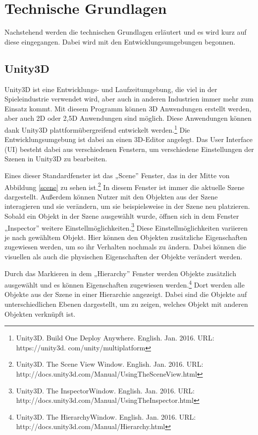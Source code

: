 \chapter{Technische Grundlagen}
	Nachstehend werden die technischen Grundlagen erläutert und es wird kurz auf diese eingegangen. Dabei wird mit den Entwicklungsumgebungen begonnen.

\section{Unity3D}

Unity3D ist eine Entwicklungs- und Laufzeitumgebung, die viel in der Spieleindustrie verwendet wird, aber auch in anderen Industrien immer mehr zum Einsatz kommt. Mit diesem Programm können 3D Anwendungen erstellt werden, aber auch 2D oder 2,5D Anwendungen sind möglich. Diese Anwendungen können dank Unity3D plattformübergreifend entwickelt werden.\footnote{Unity3D. Build One Deploy Anywhere. English. Jan. 2016. URL: https://unity3d.
com/unity/multiplatform} Die Entwicklungsumgebung ist dabei an einen 3D-Editor angelegt. Das User Interface (UI) besteht dabei aus verschiedenen Fenstern, um verschiedene Einstellungen der Szenen in Unity3D zu bearbeiten. 

Eines dieser Standardfenster ist das „Scene” Fenster, das in der Mitte von Abbildung \ref{scene} zu sehen ist.\footnote{Unity3D. The Scene View Window. English. Jan. 2016. URL: http://docs.unity3d.com/Manual/UsingTheSceneView.html} In diesem Fenster ist immer die aktuelle Szene dargestellt. Außerdem können Nutzer mit den Objekten aus der Szene interagieren und sie verändern, um sie beispielsweise in der Szene neu platzieren. Sobald ein Objekt in der Szene ausgewählt wurde, öffnen sich in dem Fenster „Inspector” weitere Einstellmöglichkeiten.\footnote{Unity3D. The InspectorWindow. English. Jan. 2016. URL: http://docs.unity3d.com/Manual/UsingTheInspector.html} Diese Einstellmöglichkeiten variieren je nach gewähltem Objekt. Hier können den Objekten zusätzliche Eigenschaften zugewiesen werden, um so ihr Verhalten nochmals zu ändern. Dabei können die visuellen als auch die physischen Eigenschaften der Objekte verändert werden.

Durch das Markieren in dem „Hierarchy” Fenster werden Objekte zusätzlich ausgewählt und es können Eigenschaften zugewiesen werden.\footnote{Unity3D. The HierarchyWindow. English. Jan. 2016. URL: http://docs.unity3d.com/Manual/Hierarchy.html} Dort werden alle Objekte aus der Szene in einer Hierarchie angezeigt. Dabei sind die Objekte auf unterschiedlichen Ebenen dargestellt, um zu zeigen, welches Objekt mit anderen Objekten verknüpft ist. 

